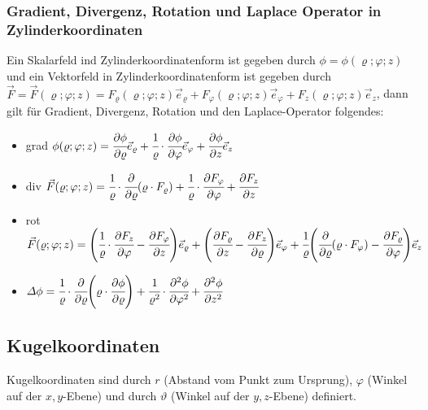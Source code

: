 \documentclass[a4paper,10pt]{scrartcl}
\begin{document}
            \subsubsection{Gradient, Divergenz, Rotation und Laplace Operator in Zylinderkoordinaten}
            Ein Skalarfeld ind Zylinderkoordinatenform ist gegeben durch \(\phi = \phi(\varrho; \varphi; z)\) und ein Vektorfeld in Zylinderkoordinatenform ist gegeben durch \(\vec{F} =
            \vec{F}(\varrho; \varphi; z) = F_\varrho(\varrho; \varphi; z)\vec{e}_\varrho + F_\varphi(\varrho; \varphi; z)\vec{e}_\varphi + F_z(\varrho; \varphi; z)\vec{e}_z \), dann gilt für Gradient, Divergenz, Rotation und 
            den Laplace-Operator folgendes: 
            \begin{itemize}
                \item grad \(\phi(\varrho; \varphi; z) = \cfrac{\partial \phi}{\partial \varrho}\vec{e}_\varrho + \cfrac{1}{\varrho} \cdot \cfrac{\partial \phi}{\partial \varphi} \vec{e}_\varphi + \cfrac{\partial \phi}{\partial z} \vec{e}_z \) 
                \item div \(\vec{F}(\varrho; \varphi; z) = \cfrac{1}{\varrho} \cdot \cfrac{\partial}{\partial \varrho}(\varrho \cdot F_\varrho) + \cfrac{1}{\varrho} \cdot \cfrac{\partial F_\varphi}{\partial \varphi} + \cfrac{\partial F_z}{\partial z} \)
                
                \item rot \(\vec{F}(\varrho; \varphi; z) = 
                \Bigg(  \cfrac{1}{\varrho} \cdot \cfrac{\partial F_z}{\partial \varphi} - \cfrac{\partial F_\varphi}{\partial z} \Bigg)\vec{e}_\varrho + 
                \Bigg(  \cfrac{\partial F_\varrho}{\partial z} - \cfrac{\partial F_z}{\partial \varrho}  \Bigg)\vec{e}_\varphi + 
                \cfrac{1}{\varrho} \Bigg(  \cfrac{\partial}{\partial \varrho}  (\varrho \cdot F_\varphi) - \cfrac{\partial F_\varrho}{\partial \varphi}  \Bigg)\vec{e}_z \)
                
                \item \(\varDelta \phi = \cfrac{1}{\varrho} \cdot \cfrac{\partial}{\partial \varrho} \Bigg( \varrho \cdot \cfrac{\partial \phi}{\partial \varrho} \Bigg) + 
                \cfrac{1}{\varrho^2} \cdot \cfrac{\partial^2 \phi}{\partial \varphi^2} + \cfrac{\partial^2 \phi}{\partial z^2} \)
            \end{itemize}
            
        \subsection{Kugelkoordinaten}
            Kugelkoordinaten sind durch \(r\) (Abstand vom Punkt zum Ursprung), \(\varphi\) (Winkel auf der \(x,y\)-Ebene) und durch \(\vartheta\) (Winkel auf der \(y,z\)-Ebene) definiert.
\end{document}
